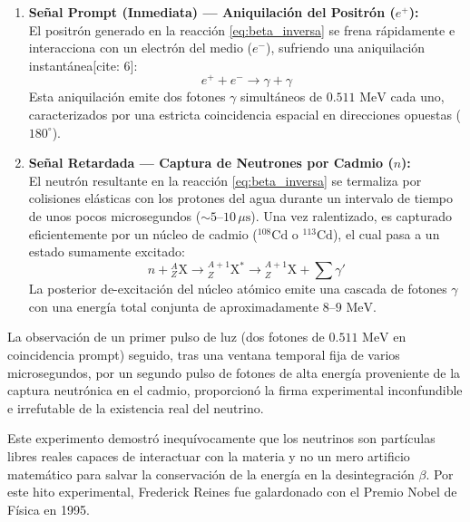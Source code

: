 \begin{enumerate}[label=\arabic*)]
    \item \textbf{Señal Prompt (Inmediata) --- Aniquilación del Positrón ($e^+$):} \\
    El positrón generado en la reacción \eqref{eq:beta_inversa} se frena rápidamente e interacciona con un electrón del medio ($e^-$), sufriendo una aniquilación instantánea[cite: 6]:
    \begin{equation}
    e^+ + e^- \longrightarrow \gamma + \gamma
    \end{equation}
    Esta aniquilación emite dos fotones $\gamma$ simultáneos de $0.511 \text{ MeV}$ cada uno, caracterizados por una estricta coincidencia espacial en direcciones opuestas ($180^\circ$).

    \item \textbf{Señal Retardada --- Captura de Neutrones por Cadmio ($n$):} \\
    El neutrón resultante en la reacción \eqref{eq:beta_inversa} se termaliza por colisiones elásticas con los protones del agua durante un intervalo de tiempo de unos pocos microsegundos ($\sim 5\text{--}10 \, \mu\text{s}$). Una vez ralentizado, es capturado eficientemente por un núcleo de cadmio ($^{108}\text{Cd}$ o $^{113}\text{Cd}$), el cual pasa a un estado sumamente excitado:
    \begin{equation}
    n + {}^{A}_{Z}\text{X} \longrightarrow {}^{A+1}_{Z}\text{X}^* \longrightarrow {}^{A+1}_{Z}\text{X} + \sum \gamma'
    \end{equation}
    La posterior de-excitación del núcleo atómico emite una cascada de fotones $\gamma$ con una energía total conjunta de aproximadamente $8\text{--}9 \text{ MeV}$.
\end{enumerate}

\begin{concepto}
La observación de un primer pulso de luz (dos fotones de $0.511 \text{ MeV}$ en coincidencia prompt) seguido, tras una ventana temporal fija de varios microsegundos, por un segundo pulso de fotones de alta energía proveniente de la captura neutrónica en el cadmio, proporcionó la firma experimental inconfundible e irrefutable de la existencia real del neutrino.
\end{concepto}

\begin{observacion}
Este experimento demostró inequívocamente que los neutrinos son partículas libres reales capaces de interactuar con la materia y no un mero artificio matemático para salvar la conservación de la energía en la desintegración $\beta$. Por este hito experimental, Frederick Reines fue galardonado con el Premio Nobel de Física en 1995.
\end{observacion}

